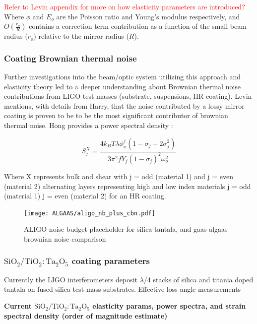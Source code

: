 \textcolor{red}{Refer to Levin appendix for more on how elasticity parameters are introduced?} Where $\phi$ and $E_o$ are the Poisson ratio and Young's modulus respectively, and $O(\frac{r_o}{R})$ contains a correction term contribution as a function of the small beam radius ($r_o$) relative to the mirror radius ($R$).

\subsubsection{Coating Brownian thermal noise}
Further investigations into the beam/optic system utilizing this approach and elasticity theory led to a deeper understanding about Brownian thermal noise contributions from LIGO test masses (substrate, suspensions, HR coating). Levin mentions, with details from Harry, that the noise contributed by a lossy mirror coating is proven to be to be the most significant contributor of brownian thermal noise. Hong provides a power spectral density \cite{Hong:2013}:

\begin{equation}
S_j^X = \frac{4k_B T \lambda \phi_x^j(1- \sigma_j - 2 \sigma_j^2)}{3 \pi^2 f Y_j (1-\sigma_j)^2 \omega_o^2}
\end{equation}

Where X represents bulk and shear with j = odd (material 1) and j = even (material 2) alternating layers representing high and low index materials j = odd (material 1) j = even (material 2) for an HR coating.

\begin{figure}[H]
    \begin{center}
    \texttt{[image: ALGAAS/aligo\_nb\_plus\_cbn.pdf]}
    \end{center}
    \caption{ALIGO noise budget placeholder for silica-tantala, and gaas-algaas brownian noise comparison}
\label{fig:aligo_tn_comparison}
\end{figure}

\subsubsection{$\mathrm{SiO_2}/\mathrm{TiO_2:Ta_2O_5}$ coating parameters}
Currently the LIGO interferometers deposit $\lambda$/4 stacks of silica and titania doped tantala on fused silica test mass substrates. Effective loss angle measurements \cite{Harry:06}

\textbf{Current $\mathrm{SiO_2}/\mathrm{TiO_2:Ta_2O_5}$ elasticity params, power spectra, and strain spectral density (order of magnitude estimate)}

